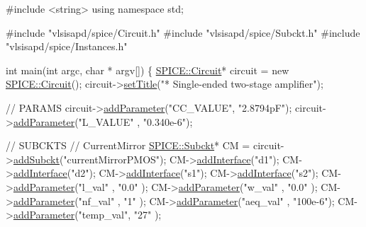 \begin{DoxyCodeInclude}
\textcolor{preprocessor}{#include <string>}
\textcolor{keyword}{using namespace }std;

\textcolor{preprocessor}{#include "vlsisapd/spice/Circuit.h"}
\textcolor{preprocessor}{#include "vlsisapd/spice/Subckt.h"}
\textcolor{preprocessor}{#include "vlsisapd/spice/Instances.h"}

\textcolor{keywordtype}{int} main(\textcolor{keywordtype}{int} argc, \textcolor{keywordtype}{char} * argv[]) \{
    \hyperlink{class_s_p_i_c_e_1_1_circuit}{SPICE::Circuit}* circuit = \textcolor{keyword}{new} \hyperlink{class_s_p_i_c_e_1_1_circuit}{SPICE::Circuit}();
    circuit->\hyperlink{class_s_p_i_c_e_1_1_circuit_a798df9ebd558e22c85eeceb5202e3123}{setTitle}(\textcolor{stringliteral}{"* Single-ended two-stage amplifier"});

    \textcolor{comment}{// PARAMS}
    circuit->\hyperlink{class_s_p_i_c_e_1_1_circuit_ab3ab147a16bc490ce96db905a4ca271c}{addParameter}(\textcolor{stringliteral}{"CC\_VALUE"}, \textcolor{stringliteral}{"2.8794pF"});
    circuit->\hyperlink{class_s_p_i_c_e_1_1_circuit_ab3ab147a16bc490ce96db905a4ca271c}{addParameter}(\textcolor{stringliteral}{"L\_VALUE"} , \textcolor{stringliteral}{"0.340e-6"});

    \textcolor{comment}{// SUBCKTS}
    \textcolor{comment}{// CurrentMirror}
    \hyperlink{class_s_p_i_c_e_1_1_subckt}{SPICE::Subckt}* CM = circuit->\hyperlink{class_s_p_i_c_e_1_1_circuit_a0d1352e46d4537ce1e5f651de40e91a6}{addSubckt}(\textcolor{stringliteral}{"currentMirrorPMOS"});
    CM->\hyperlink{class_s_p_i_c_e_1_1_subckt_ac162264683fa3d9b3384d3e8cc291fa2}{addInterface}(\textcolor{stringliteral}{"d1"});
    CM->\hyperlink{class_s_p_i_c_e_1_1_subckt_ac162264683fa3d9b3384d3e8cc291fa2}{addInterface}(\textcolor{stringliteral}{"d2"});
    CM->\hyperlink{class_s_p_i_c_e_1_1_subckt_ac162264683fa3d9b3384d3e8cc291fa2}{addInterface}(\textcolor{stringliteral}{"s1"});
    CM->\hyperlink{class_s_p_i_c_e_1_1_subckt_ac162264683fa3d9b3384d3e8cc291fa2}{addInterface}(\textcolor{stringliteral}{"s2"});
    CM->\hyperlink{class_s_p_i_c_e_1_1_subckt_ab3ab147a16bc490ce96db905a4ca271c}{addParameter}(\textcolor{stringliteral}{"l\_val"}   , \textcolor{stringliteral}{"0.0"}   );
    CM->\hyperlink{class_s_p_i_c_e_1_1_subckt_ab3ab147a16bc490ce96db905a4ca271c}{addParameter}(\textcolor{stringliteral}{"w\_val"}   , \textcolor{stringliteral}{"0.0"}   );
    CM->\hyperlink{class_s_p_i_c_e_1_1_subckt_ab3ab147a16bc490ce96db905a4ca271c}{addParameter}(\textcolor{stringliteral}{"nf\_val"}  , \textcolor{stringliteral}{"1"}     );
    CM->\hyperlink{class_s_p_i_c_e_1_1_subckt_ab3ab147a16bc490ce96db905a4ca271c}{addParameter}(\textcolor{stringliteral}{"aeq\_val"} , \textcolor{stringliteral}{"100e-6"});
    CM->\hyperlink{class_s_p_i_c_e_1_1_subckt_ab3ab147a16bc490ce96db905a4ca271c}{addParameter}(\textcolor{stringliteral}{"temp\_val"}, \textcolor{stringliteral}{"27"}    );


\end{DoxyCodeInclude}
